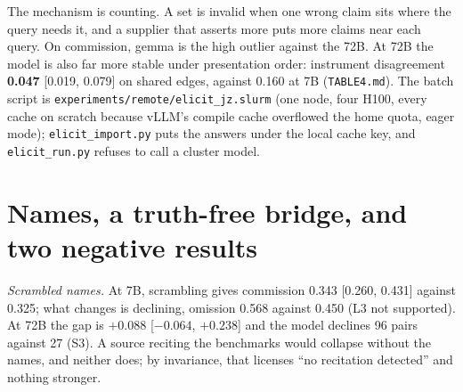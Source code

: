 The mechanism is counting. A set is invalid when one wrong claim sits where the query needs it, and a
supplier that asserts more puts more claims near each query. On commission, gemma is the high outlier
against the 72B.
At 72B the model is also far more stable under presentation order: instrument disagreement
\textbf{0.047} [0.019, 0.079] on shared edges, against 0.160 at 7B (\texttt{TABLE4.md}). The batch
script is \texttt{experiments/remote/elicit\_jz.slurm} (one node, four H100, every cache on scratch
because vLLM's compile cache overflowed the home quota, eager mode); \texttt{elicit\_import.py} puts the
answers under the local cache key, and \texttt{elicit\_run.py} refuses to call a cluster model.



\begin{antes}
\end{antes}

\section{Names, a truth-free bridge, and two negative results}\label{sec:sup-names}

\emph{Scrambled names.} At 7B, scrambling gives commission 0.343 [0.260, 0.431] against 0.325; what
changes is declining, omission 0.568 against 0.450 (L3 not supported). At 72B the gap is $+0.088$
[$-0.064$, $+0.238$] and the model declines 96 pairs against 27 (S3). A source reciting the benchmarks
would collapse without the names, and neither does; by invariance, that licenses ``no recitation
detected'' and nothing stronger.

